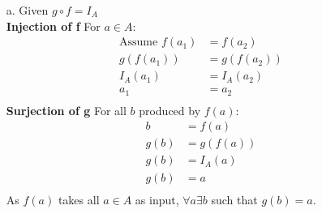 \documentclass{article}
\begin{document}
\begin{enumerate}
    \item[a.] Given $g \circ f = I_A$\\
          \textbf{Injection of f } For $a \in A$:\[\begin{aligned}
                  \text{Assume } f(a_1) & = f(a_2)    \\
                  g(f(a_1))             & = g(f(a_2)) \\
                  I_A(a_1)              & = I_A(a_2)  \\
                  a_1                   & = a_2       \\
              \end{aligned}\]
          \textbf{Surjection of g } For all $b$ produced by $f(a)$: \[\begin{aligned}
                  b    & = f(a)    \\
                  g(b) & = g(f(a)) \\
                  g(b) & = I_A(a)  \\
                  g(b) & = a       \\
              \end{aligned}\]
          As $f(a)$ takes all $a \in A$ as input, $\forall a \exists b$ such that $g(b)=a$.\\


\end{enumerate}
\end{document}
